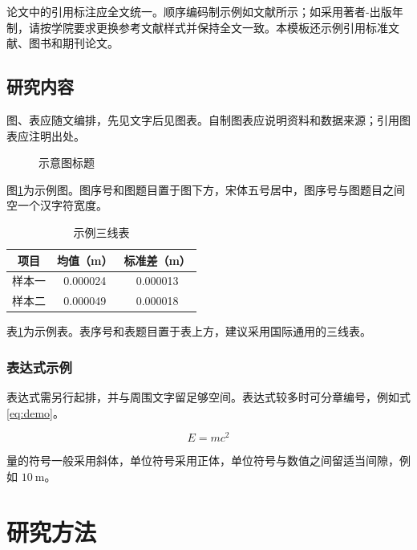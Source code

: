 \documentclass{cugthesis}
\begin{document}
论文中的引用标注应全文统一。顺序编码制示例如文献所示；如采用著者-出版年制，请按学院要求更换参考文献样式并保持全文一致。本模板还示例引用标准文献、图书和期刊论文。

\section{研究内容}

图、表应随文编排，先见文字后见图表。自制图表应说明资料和数据来源；引用图表应注明出处。

\begin{figure}[htbp]
  \centering
  \fbox{\rule{0pt}{4cm}\rule{0.8\textwidth}{0pt}}
  \caption{示意图标题}
  \label{fig:demo}
\end{figure}

图\ref{fig:demo}为示例图。图序号和图题目置于图下方，宋体五号居中，图序号与图题目之间空一个汉字符宽度。

\begin{table}[htbp]
  \centering
  \caption{示例三线表}
  \label{tab:demo}
  \begin{tabular}{ccc}
    \toprule
    项目 & 均值（m） & 标准差（m） \\
    \midrule
    样本一 & 0.000024 & 0.000013 \\
    样本二 & 0.000049 & 0.000018 \\
    \bottomrule
  \end{tabular}
\end{table}

表\ref{tab:demo}为示例表。表序号和表题目置于表上方，建议采用国际通用的三线表。

\subsection{表达式示例}

表达式需另行起排，并与周围文字留足够空间。表达式较多时可分章编号，例如式\eqref{eq:demo}。

\begin{equation}
  E = mc^2
  \label{eq:demo}
\end{equation}

量的符号一般采用斜体，单位符号采用正体，单位符号与数值之间留适当间隙，例如 $10\ \mathrm{m}$。

\chapter{研究方法}
\end{document}
